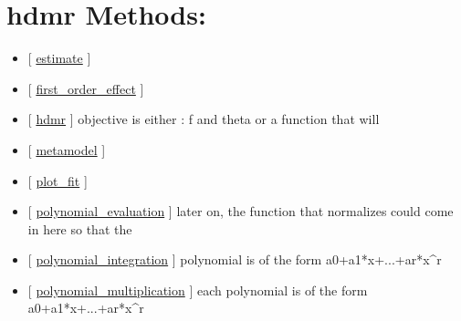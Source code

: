 \documentclass[letterpaper,10pt,english]{sphinxmanual}
\begin{document}
\section{hdmr Methods:}
\label{classes/utils/@hdmr/hdmr:hdmr-methods}\begin{itemize}
\item {} 
{[} {\hyperref[classes/utils/@hdmr/hdmr:estimate]{estimate}} {]}

\item {} 
{[} {\hyperref[classes/utils/@hdmr/hdmr:first-order-effect]{first\_order\_effect}} {]}

\item {} 
{[} {\hyperref[classes/utils/@hdmr/hdmr:hdmr]{hdmr}} {]}   objective is either : f and theta or a function that will

\item {} 
{[} {\hyperref[classes/utils/@hdmr/hdmr:metamodel]{metamodel}} {]}

\item {} 
{[} {\hyperref[classes/utils/@hdmr/hdmr:plot-fit]{plot\_fit}} {]}

\item {} 
{[} {\hyperref[classes/utils/@hdmr/hdmr:polynomial-evaluation]{polynomial\_evaluation}} {]}   later on, the function that normalizes could come in here so that the

\item {} 
{[} {\hyperref[classes/utils/@hdmr/hdmr:polynomial-integration]{polynomial\_integration}} {]}   polynomial is of the form a0+a1*x+...+ar*x\textasciicircum{}r

\item {} 
{[} {\hyperref[classes/utils/@hdmr/hdmr:polynomial-multiplication]{polynomial\_multiplication}} {]}   each polynomial is of the form a0+a1*x+...+ar*x\textasciicircum{}r

\end{itemize}
\end{document}
